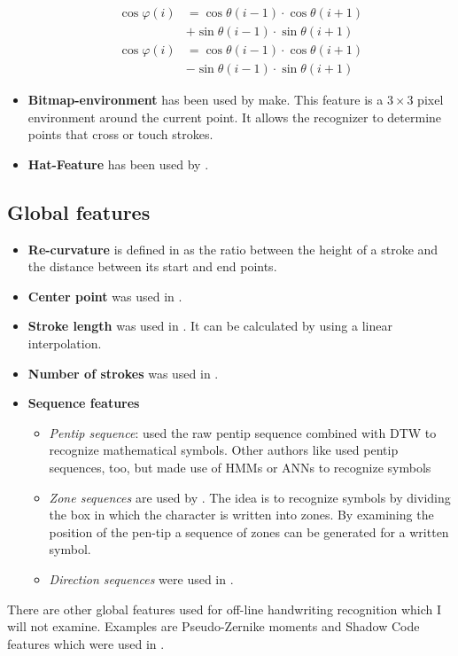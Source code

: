 \begin{itemize}
\begin{align}
              \cos \varphi(i) &=\cos \theta (i-1) \cdot \cos \theta (i+1)\\
                              &+\sin \theta (i-1) \cdot \sin \theta (i+1)\\
              \cos \varphi(i) &=\cos \theta (i-1) \cdot \cos \theta (i+1)\\
                              &-\sin \theta (i-1) \cdot \sin \theta (i+1)
          \end{align}
    \item \textbf{Bitmap-environment} has been used by \cite{Manke94}make. This
          feature is a $3 \times 3$ pixel environment around the current point.
          It allows the recognizer to determine points that cross or touch
          strokes. 
    \item \textbf{Hat-Feature} has been used by \cite{ICASSP-94,Manke00}.
\end{itemize}


\subsection{Global features}
\begin{itemize}
    \item \textbf{Re-curvature} is defined in \cite{Huang06,Huang09} as the
          ratio between the height of a stroke and the distance between its
          start and end points.
    \item \textbf{Center point} was used in \cite{Huang06}.
    \item \textbf{Stroke length} was used in \cite{Huang06}. It can be
          calculated by using a linear interpolation.
    \item \textbf{Number of strokes} was used in \cite{Huang09}.
    \item \textbf{Sequence features}
    \begin{itemize}
        \item \textit{Pentip sequence}: \cite{Kirsch} used the raw pentip
              sequence combined with \gls{DTW} to recognize mathematical symbols.
              Other authors like \cite{Koschinski95} used pentip sequences, too,
              but made use of \glspl{HMM} or \glspl{ANN} to recognize symbols
        \item \textit{Zone sequences} are used by \cite{Brown1964,Hanaki80}. The
          idea is to recognize symbols by dividing the box in which the
          character is written into zones. By examining the position of the
          pen-tip a sequence of zones can be generated for a written symbol.
        \item \textit{Direction sequences} were used in \cite{Impedovo1976,Powers1973}.
    \end{itemize}
\end{itemize}

There are other global features used for off-line handwriting recognition which
I will not examine. Examples are Pseudo-Zernike moments and Shadow Code features
which were used in \cite{Khotanzad}.